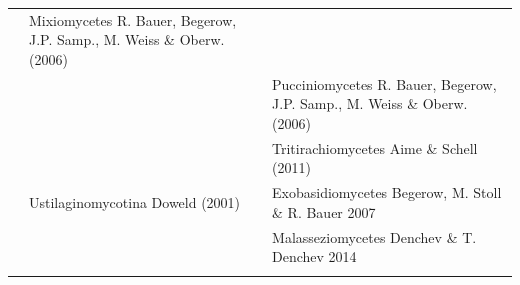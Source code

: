\documentclass[]{book}
\begin{document}
\begin{longtable}[]{@{}lll@{}}
\begin{minipage}[t]{0.28\columnwidth}
\strut
\end{minipage} & \begin{minipage}[t]{0.31\columnwidth}\raggedright
Mixiomycetes R. Bauer, Begerow, J.P. Samp., M. Weiss \& Oberw. (2006)\strut
\end{minipage}\tabularnewline
\begin{minipage}[t]{0.32\columnwidth}\raggedright
\strut
\end{minipage} & \begin{minipage}[t]{0.28\columnwidth}\raggedright
\strut
\end{minipage} & \begin{minipage}[t]{0.31\columnwidth}\raggedright
Pucciniomycetes R. Bauer, Begerow, J.P. Samp., M. Weiss \& Oberw. (2006)\strut
\end{minipage}\tabularnewline
\begin{minipage}[t]{0.32\columnwidth}\raggedright
\strut
\end{minipage} & \begin{minipage}[t]{0.28\columnwidth}\raggedright
\strut
\end{minipage} & \begin{minipage}[t]{0.31\columnwidth}\raggedright
Tritirachiomycetes Aime \& Schell (2011)\strut
\end{minipage}\tabularnewline
\begin{minipage}[t]{0.32\columnwidth}\raggedright
\strut
\end{minipage} & \begin{minipage}[t]{0.28\columnwidth}\raggedright
Ustilaginomycotina Doweld (2001)\strut
\end{minipage} & \begin{minipage}[t]{0.31\columnwidth}\raggedright
Exobasidiomycetes Begerow, M. Stoll \& R. Bauer 2007\strut
\end{minipage}\tabularnewline
\begin{minipage}[t]{0.32\columnwidth}\raggedright
\strut
\end{minipage} & \begin{minipage}[t]{0.28\columnwidth}\raggedright
\strut
\end{minipage} & \begin{minipage}[t]{0.31\columnwidth}\raggedright
Malasseziomycetes Denchev \& T. Denchev 2014\strut
\end{minipage}\tabularnewline
\begin{minipage}[t]{0.32\columnwidth}\raggedright
\strut
\end{minipage} & \begin{minipage}[t]{0.28\columnwidth}\raggedright

\end{minipage}
\end{longtable}
\end{document}
